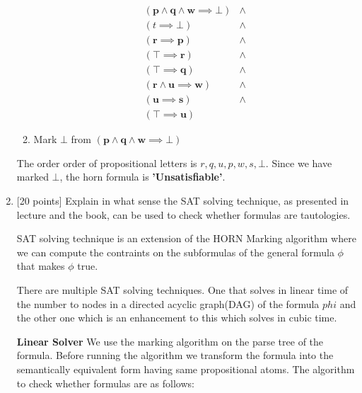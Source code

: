 \documentclass{article}
\begin{document}
\begin{enumerate}
\begin{answer}
\begin{enumerate}
		\begin{displaymath}
    		\begin{array}{ll}
   				(\textbf{p} \land \textbf{q} \land \textbf{w} \implies \bot) &\land \\
    			(t \implies \bot) &\land \\
    			(\textbf{r} \implies \textbf{p}) &\land \\
    			(\top \implies \textbf{r}) &\land \\
    			(\top \implies \textbf{q}) &\land \\
    			(\textbf{r} \land \textbf{u} \implies \textbf{w}) &\land \\
    			(\textbf{u} \implies \textbf{s}) &\land \\
    			(\top \implies \textbf{u})
    		\end{array}
  		\end{displaymath}
  		
  		\item Mark $\bot$ from $(\textbf{p} \land \textbf{q} \land \textbf{w}
  		\implies \bot)$
  		
	\end{enumerate}
	
	The order order of propositional letters is $r, q, u, p, w, s, \bot$. 
	Since we have marked $\bot$, the horn formula is \textbf{'Unsatisfiable'}.
\end{answer}

\item {[20 points]}  Explain in what sense the SAT solving
  technique, as presented in lecture and the book, can be used to
  check whether formulas are tautologies.
  
  \begin{answer}
  	SAT solving technique is an extension of the HORN Marking algorithm where we
  	can compute the contraints on the subformulas of the general formula $\phi$
  	that makes $\phi$ true.
  	
  	There are multiple SAT solving techniques. One that solves in linear time of
  	the number to nodes in a directed acyclic graph(DAG) of the formula $phi$ and
  	the other one which is an enhancement to this which solves in cubic time.
  	
  	\textbf{Linear Solver}
  	We use the marking algorithm on the parse tree of the formula. Before running
  	the algorithm we transform the formula into the semantically equivalent form
  	having same propositional atoms. The algorithm to check whether formulas are
  	as follows:
  	

\end{answer}
\end{enumerate}
\end{document}
